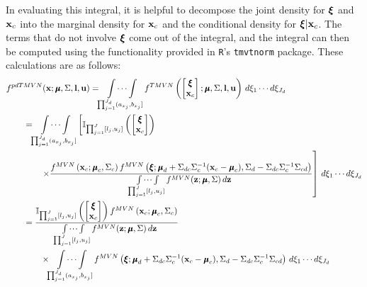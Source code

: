 \documentclass[fleqn]{article}
\newcommand{\ind}{\mathbb{I}}
\begin{document}
In evaluating this integral, it is helpful to decompose the joint density for $\bxi$ and ${\bf x}_c$ into the marginal density for ${\bf x}_c$ and the conditional density for $\bxi | \bx_c$.  The terms that do not involve $\bxi$ come out of the integral, and the integral can then be computed using the functionality provided in {\tt R}'s {\tt tmvtnorm} package.  These calculations are as follows:
\begin{align}
&f^{pdTMVN}(\bx ; \bmu, \Sigma, \bl, \bu) = \idotsint\limits_{\prod_{j=1}^{J_d} (a_{x_j}, b_{x_j}]} f^{TMVN}\left(\begin{bmatrix} \bxi \\ \bx_c \end{bmatrix}; \bmu, \Sigma, \bl, \bu\right) \, d \xi_1 \cdots d \xi_{J_d} \nonumber \\
&\qquad = \idotsint\limits_{\prod_{j=1}^{J_d} (a_{x_j}, b_{x_j}]} \left[ \ind_{\prod_{j=1}^J [l_j, u_j]}\left(\begin{bmatrix} \bxi \\ \bx_c \end{bmatrix}\right) \right. \nonumber \\
&\qquad \qquad \left. \times \frac{f^{MVN}\left(\bx_c; \bmu_c, \Sigma_c \right) f^{MVN}\left(\bxi; \bmu_d + \Sigma_{dc} \Sigma_c^{-1}(\bx_c - \bmu_c), \Sigma_d - \Sigma_{dc} \Sigma_{c}^{-1} \Sigma_{cd} \right)}{\idotsint\limits_{\prod_{j=1}^J [l_j, u_j]} f^{MVN}(\bz ; \bmu, \Sigma) \, d \bz } \right] \, d \xi_1 \cdots d \xi_{J_d} \nonumber \\
&\qquad = \frac{\ind_{\prod_{j=1}^J [l_j, u_j]}\left(\begin{bmatrix} \bxi \\ \bx_c \end{bmatrix}\right) f^{MVN}\left(\bx_c; \bmu_c, \Sigma_c \right)}{\idotsint\limits_{\prod_{j=1}^J [l_j, u_j]} f^{MVN}(\bz ; \bmu, \Sigma) \, d \bz } \nonumber \\
&\qquad \qquad \times \idotsint\limits_{\prod_{j=1}^{J_d} (a_{x_j}, b_{x_j}]} f^{MVN}\left(\bxi; \bmu_d + \Sigma_{dc} \Sigma_c^{-1}(\bx_c - \bmu_c), \Sigma_d - \Sigma_{dc} \Sigma_{c}^{-1} \Sigma_{cd} \right) \, d \xi_1 \cdots d \xi_{J_d} \label{eqn:evalDensityInTermsOfSigma}
\end{align}
\end{document}
